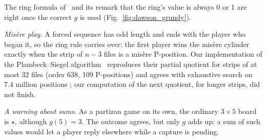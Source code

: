 The ring formula of~\cite{Study2025} and its remark that the ring's value is always 0 or 1 are
right once the correct $g$ is used (Fig.~\ref{fig:dawson_grundy}).

\emph{Mis\`ere play.} A forced sequence has odd length and ends with the player who began it, so the
ring rule carries over: the first player wins the mis\`ere cylinder exactly when the strip of $n-3$ files is
a mis\`ere P-position. Our implementation of the Plambeck--Siegel algorithm~\cite{PlambeckSiegel2008}
reproduces their partial quotient for strips of at most 32 files (order 638, 109 P-positions) and agrees
with exhaustive search on 7.4 million positions ; our computation of the next quotient, for longer strips, did not finish.

\emph{A warning about sums.} As a partizan game on its own, the ordinary $3\times5$ board is $\star$,
although $g(5)=3$. The outcome agrees, but only $g$ adds up: a sum of such values would let a player reply
elsewhere while a capture is pending.
